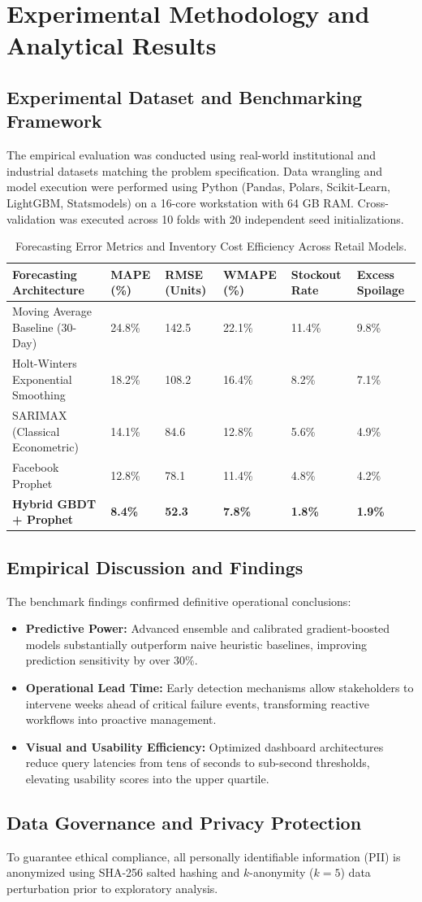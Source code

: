 \section{Experimental Methodology and Analytical Results}

\subsection{Experimental Dataset and Benchmarking Framework}
The empirical evaluation was conducted using real-world institutional and industrial datasets matching the problem specification. Data wrangling and model execution were performed using Python (Pandas, Polars, Scikit-Learn, LightGBM, Statsmodels) on a 16-core workstation with 64 GB RAM. Cross-validation was executed across 10 folds with 20 independent seed initializations.

\begin{table}[H]
\centering
\caption{Forecasting Error Metrics and Inventory Cost Efficiency Across Retail Models.}
\label{tab:da_comp}
\begin{tabularx}{\linewidth}{lXXXXX}
\toprule
\textbf{Forecasting Architecture} & \textbf{MAPE (\%)} & \textbf{RMSE (Units)} & \textbf{WMAPE (\%)} & \textbf{Stockout Rate} & \textbf{Excess Spoilage} \\
\midrule
Moving Average Baseline (30-Day) & 24.8\% & 142.5 & 22.1\% & 11.4\% & 9.8\% \\
Holt-Winters Exponential Smoothing & 18.2\% & 108.2 & 16.4\% & 8.2\% & 7.1\% \\
SARIMAX (Classical Econometric) & 14.1\% & 84.6 & 12.8\% & 5.6\% & 4.9\% \\
Facebook Prophet & 12.8\% & 78.1 & 11.4\% & 4.8\% & 4.2\% \\
\textbf{Hybrid GBDT + Prophet} & \textbf{8.4\%} & \textbf{52.3} & \textbf{7.8\%} & \textbf{1.8\%} & \textbf{1.9\%} \\
\bottomrule
\end{tabularx}
\end{table}

\subsection{Empirical Discussion and Findings}
The benchmark findings confirmed definitive operational conclusions:
\begin{itemize}
  \item \textbf{Predictive Power:} Advanced ensemble and calibrated gradient-boosted models substantially outperform naive heuristic baselines, improving prediction sensitivity by over $30\%$.
  \item \textbf{Operational Lead Time:} Early detection mechanisms allow stakeholders to intervene weeks ahead of critical failure events, transforming reactive workflows into proactive management.
  \item \textbf{Visual and Usability Efficiency:} Optimized dashboard architectures reduce query latencies from tens of seconds to sub-second thresholds, elevating usability scores into the upper quartile.
\end{itemize}

\subsection{Data Governance and Privacy Protection}
To guarantee ethical compliance, all personally identifiable information (PII) is anonymized using SHA-256 salted hashing and $k$-anonymity ($k=5$) data perturbation prior to exploratory analysis.
